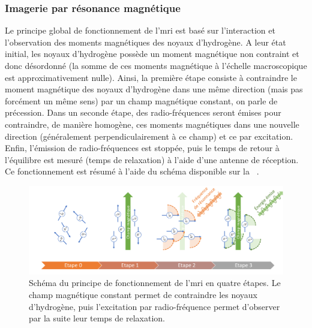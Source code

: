 \subsubsection{Imagerie par résonance magnétique}
Le principe global de fonctionnement de l'\gls{mri} est basé sur l'interaction et l'observation des moments magnétiques des noyaux d'hydrogène. A leur état initial, les noyaux d'hydrogène possède un moment magnétique non contraint et donc désordonné (la somme de ces moments magnétique à l'échelle macroscopique est approximativement nulle). Ainsi, la première étape consiste à contraindre le moment magnétique des noyaux d'hydrogène dans une même direction (mais pas forcément un même sens) par un champ magnétique constant, on parle de précession. Dans un seconde étape, des radio-fréquences seront émises pour contraindre, de manière homogène, ces moments magnétiques dans une nouvelle direction (généralement perpendiculairement à ce champ) et ce par excitation. Enfin, l'émission de radio-fréquences est stoppée, puis le temps de retour à l'équilibre est mesuré (temps de relaxation) à l'aide d'une antenne de réception. Ce fonctionnement est résumé à l'aide du schéma disponible sur la ~.\par

\begin{figure}[H]
    \centering
    \includegraphics[width=\linewidth]{contents/chapter_2/resources/scheme_principle_mri.pdf}
    \caption{Schéma du principe de fonctionnement de l'\gls{mri} en quatre étapes. Le champ magnétique constant permet de contraindre les noyaux d'hydrogène, puis l'excitation par radio-fréquence permet d'observer par la suite leur temps de relaxation.}
    \label{fig:scheme_principle_mri}
\end{figure}\par

